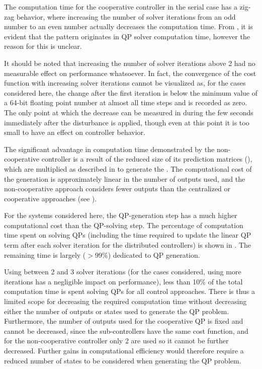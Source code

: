 The computation time for the cooperative controller in the serial case has a zig-zag behavior, where increasing the number of solver iterations from an odd number to an even number actually decreases the computation time.
From , it is evident that the pattern originates in QP solver computation time, however the reason for this is unclear.

It should be noted that increasing the number of solver iterations above 2 had no measurable effect on performance whatsoever.
In fact, the convergence of the cost function with increasing solver iterations cannot be visualized as, for the cases considered here, the change after the first iteration is below the minimum value of a 64-bit floating point number at almost all time steps and is recorded as zero.
The only point at which the decrease can be measured in during the few seconds immediately after the disturbance is applied, though even at this point it is too small to have an effect on controller behavior.

The significant advantage in computation time demonstrated by the non-cooperative controller is a result of the reduced size of its prediction matrices (), which are multiplied as described in  to generate the .
The computational cost of the  generation is approximately linear in the number of outputs used, and the non-cooperative approach considers fewer outputs than the centralized or cooperative approaches (see ).

For the systems considered here, the QP-generation step has a much higher computational cost than the QP-solving step.
The percentage of computation time spent on solving QPs (including the time required to update the linear QP term after each solver iteration for the distributed controllers) is shown in .
The remaining time is largely ($>99\%$) dedicated to QP generation.

Using between 2 and 3 solver iterations (for the cases considered, using more iterations has a negligible impact on performance), less than 10\% of the total computation time is spent solving QPs for all control approaches. 
There is thus a limited scope for decreasing the required computation time without decreasing either the number of outputs or states used to generate the QP problem.
Furthermore, the number of outputs used for the cooperative QP is fixed and cannot be decreased, since the sub-controllers have the same cost function, and for the non-cooperative controller only 2 are used so it cannot be further decreased.
Further gains in computational efficiency would therefore require a reduced number of states to be considered when generating the QP problem.

